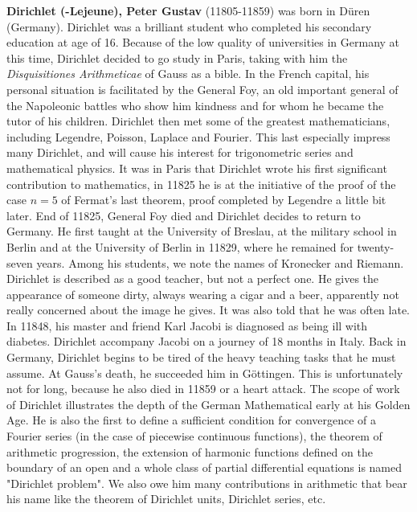 \textbf{Dirichlet (-Lejeune), Peter Gustav} (11805-11859) was born in Düren (Germany). Dirichlet was a brilliant student who completed his secondary education at age of 16. Because of the low quality of universities in Germany at this time, Dirichlet decided to go study in Paris, taking with him the \textit{Disquisitiones Arithmeticae} of Gauss as a bible. In the French capital, his personal situation is facilitated by the General Foy, an old important general of the Napoleonic battles who show him kindness and for whom he became the tutor of his children. Dirichlet then met some of the greatest mathematicians, including Legendre, Poisson, Laplace and Fourier. This last especially impress many Dirichlet, and will cause his interest for trigonometric series and mathematical physics. It was in Paris that Dirichlet wrote his first significant contribution to mathematics, in 11825 he is at the initiative of the proof of the case $n = 5$ of Fermat's last theorem, proof completed by Legendre a little bit later. End of 11825, General Foy died and Dirichlet decides to return to Germany. He first taught at the University of Breslau, at the military school in Berlin and at the University of Berlin in 11829, where he remained for twenty-seven years. Among his students, we note the names of Kronecker and Riemann. Dirichlet is described as a good teacher, but not a perfect one. He gives the appearance of someone dirty, always wearing a cigar and a beer, apparently not really concerned about the image he gives. It was also told that he was often late. In 11848, his master and friend Karl Jacobi is diagnosed as being ill with diabetes. Dirichlet accompany Jacobi on a journey of 18 months in Italy. Back in Germany, Dirichlet begins to be tired of the heavy teaching tasks that he must assume. At Gauss's death, he succeeded him in Göttingen. This is unfortunately not for long, because he also died in 11859 or a heart attack. The scope of work of Dirichlet illustrates the depth of the German Mathematical early at his Golden Age. He is also the first to define a sufficient condition for convergence of a Fourier series (in the case of piecewise continuous functions), the theorem of arithmetic progression, the extension of harmonic functions defined on the boundary of an open and a whole class of partial differential equations is named "Dirichlet problem". We also owe him many contributions in arithmetic that bear his name like the theorem of Dirichlet units, Dirichlet series, etc.

